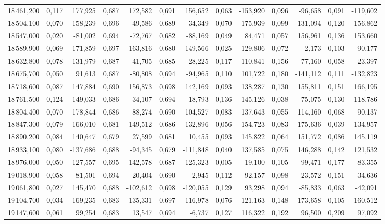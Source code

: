 \begin{longtable}{rrrrrrrrrrrrr}
18\,461,200 & 0,117 & 177,925 & 0,687 & 172,582 & 0,691 & 156,652 & 0,063 & -153,920 & 0,096 & -96,658 & 0,091 & -119,602\\
18\,504,100 & 0,070 & 158,239 & 0,696 & 49,586 & 0,689 & 34,349 & 0,070 & 175,939 & 0,099 & -131,094 & 0,120 & -156,862\\
18\,547,000 & 0,020 & -81,002 & 0,694 & -72,767 & 0,682 & -88,169 & 0,049 & 84,471 & 0,057 & 156,961 & 0,136 & 153,660\\
18\,589,900 & 0,069 & -171,859 & 0,697 & 163,816 & 0,680 & 149,566 & 0,025 & 129,806 & 0,072 & 2,173 & 0,103 & 90,177\\
18\,632,800 & 0,078 & 131,979 & 0,687 & 41,705 & 0,685 & 28,225 & 0,117 & 110,841 & 0,156 & -77,160 & 0,058 & -23,397\\
18\,675,700 & 0,050 & 91,613 & 0,687 & -80,808 & 0,694 & -94,965 & 0,110 & 101,722 & 0,180 & -141,112 & 0,111 & -132,823\\
18\,718,600 & 0,087 & 147,884 & 0,690 & 156,873 & 0,698 & 142,169 & 0,093 & 138,287 & 0,130 & 155,811 & 0,151 & 166,195\\
18\,761,500 & 0,124 & 149,033 & 0,686 & 34,107 & 0,694 & 18,793 & 0,136 & 145,126 & 0,038 & 75,075 & 0,130 & 118,786\\
18\,804,400 & 0,070 & -178,844 & 0,686 & -88,274 & 0,690 & -104,527 & 0,083 & 137,643 & 0,055 & -114,160 & 0,068 & 90,137\\
18\,847,300 & 0,079 & 166,010 & 0,681 & 149,512 & 0,686 & 132,896 & 0,056 & 154,723 & 0,083 & -175,636 & 0,039 & 134,957\\
18\,890,200 & 0,084 & 140,647 & 0,679 & 27,599 & 0,681 & 10,455 & 0,093 & 145,822 & 0,064 & 151,772 & 0,086 & 145,119\\
18\,933,100 & 0,080 & -137,686 & 0,688 & -94,345 & 0,679 & -111,848 & 0,040 & 137,585 & 0,075 & 146,288 & 0,142 & 121,532\\
18\,976,000 & 0,050 & -127,557 & 0,695 & 142,578 & 0,687 & 125,323 & 0,005 & -19,100 & 0,105 & 99,471 & 0,177 & 83,355\\
19\,018,900 & 0,058 & 81,501 & 0,694 & 20,404 & 0,690 & 2,945 & 0,112 & 92,157 & 0,098 & 23,572 & 0,151 & 34,636\\
19\,061,800 & 0,027 & 145,470 & 0,688 & -102,612 & 0,698 & -120,055 & 0,129 & 93,298 & 0,094 & -85,833 & 0,063 & -42,091\\
19\,104,700 & 0,034 & -169,235 & 0,683 & 135,331 & 0,697 & 116,978 & 0,076 & 121,163 & 0,148 & 173,658 & 0,105 & 160,512\\
19\,147,600 & 0,061 & 99,254 & 0,683 & 13,547 & 0,694 & -6,737 & 0,127 & 116,322 & 0,192 & 96,500 & 0,209 & 97,092\\

\end{longtable}
